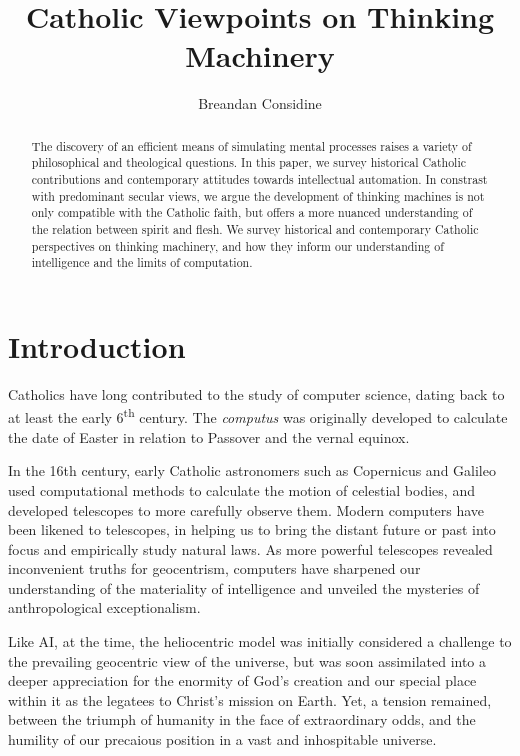 \documentclass[sigplan,nonacm]{acmart}\settopmatter{printfolios=false,printccs=false,printacmref=false}
\begin{document}
  \title{Catholic Viewpoints on Thinking Machinery}
  \begin{abstract}
  The discovery of an efficient means of simulating mental processes raises a variety of philosophical and theological questions. In this paper, we survey historical Catholic contributions and contemporary attitudes towards intellectual automation. In constrast with predominant secular views, we argue the development of thinking machines is not only compatible with the Catholic faith, but offers a more nuanced understanding of the relation between spirit and flesh. We survey historical and contemporary Catholic perspectives on thinking machinery, and how they inform our understanding of intelligence and the limits of computation.
  \end{abstract}

  \author{Breandan Considine}

  \maketitle

  \section{Introduction}

  Catholics have long contributed to the study of computer science, dating back to at least the early 6\textsuperscript{th} century. The \textit{computus} was originally developed to calculate the date of Easter in relation to Passover and the vernal equinox.

  In the 16th century, early Catholic astronomers such as Copernicus and Galileo used computational methods to calculate the motion of celestial bodies, and developed telescopes to more carefully observe them. Modern computers have been likened to telescopes, in helping us to bring the distant future or past into focus and empirically study natural laws. As more powerful telescopes revealed inconvenient truths for geocentrism, computers have sharpened our understanding of the materiality of intelligence and unveiled the mysteries of anthropological exceptionalism.

  Like AI, at the time, the heliocentric model was initially considered a challenge to the prevailing geocentric view of the universe, but was soon assimilated into a deeper appreciation for the enormity of God's creation and our special place within it as the legatees to Christ's mission on Earth. Yet, a tension remained, between the triumph of humanity in the face of extraordinary odds, and the humility of our precaious position in a vast and inhospitable universe.
\end{document}
